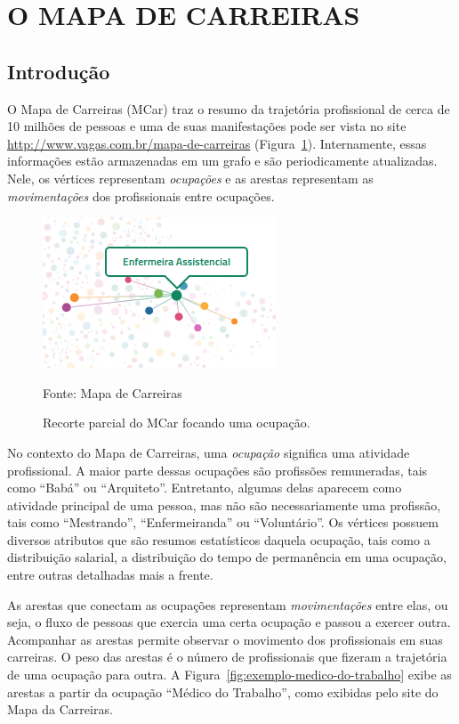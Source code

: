 \documentclass[12pt,a4paper]{article}
\newcommand{\source}[1]{\vspace{-10pt} \caption*{Fonte: {#1}} }
\begin{document}
\section{O MAPA DE CARREIRAS} \label{sec:mapa-de-carreiras}

\subsection{Introdução}

O Mapa de Carreiras (MCar) traz o resumo da trajetória profissional de cerca de 10 milhões de pessoas e uma de suas manifestações pode ser vista no site \url{http://www.vagas.com.br/mapa-de-carreiras} (Figura~\ref{fig:exemplo-grafo}). Internamente, essas informações estão armazenadas em um grafo e são periodicamente atualizadas. Nele, os vértices representam \textit{ocupações} e as arestas representam as \textit{movimentações} dos profissionais entre ocupações.

\begin{figure}[ht]
  \centering
  \includegraphics[scale=0.8, frame]{mapa-enfermeira-assistencial.png}
  \caption{Recorte parcial do MCar focando uma ocupação.}
  \source{Mapa de Carreiras}
  \label{fig:exemplo-grafo}
\end{figure}

No contexto do Mapa de Carreiras, uma \textit{ocupação} significa uma atividade profissional. A maior parte dessas ocupações são profissões remuneradas, tais como \enquote{Babá} ou \enquote{Arquiteto}. Entretanto, algumas delas aparecem como atividade principal de uma pessoa, mas não são necessariamente uma profissão, tais como \enquote{Mestrando}, \enquote{Enfermeiranda} ou \enquote{Voluntário}. Os vértices possuem diversos atributos que são resumos estatísticos daquela ocupação, tais como a distribuição salarial, a distribuição do tempo de permanência em uma ocupação, entre outras detalhadas mais a frente.

As arestas que conectam as ocupações representam \textit{movimentações} entre elas, ou seja, o fluxo de pessoas que exercia uma certa ocupação e passou a exercer outra. Acompanhar as arestas permite observar o movimento dos profissionais em suas carreiras. O peso das arestas é o número de profissionais que fizeram a trajetória de uma ocupação para outra. A Figura~\ref{fig:exemplo-medico-do-trabalho} exibe as arestas a partir da ocupação \enquote{Médico do Trabalho}, como exibidas pelo site do Mapa da Carreiras.
\end{document}
